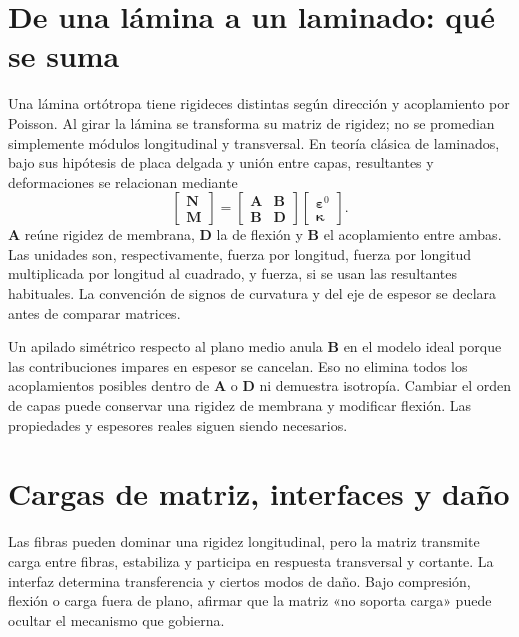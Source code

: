 
\section{De una lámina a un laminado: qué se suma}
Una lámina ortótropa tiene rigideces distintas según dirección y acoplamiento por Poisson. Al girar la lámina se transforma su matriz de rigidez; no se promedian simplemente módulos longitudinal y transversal. En teoría clásica de laminados, bajo sus hipótesis de placa delgada y unión entre capas, resultantes y deformaciones se relacionan mediante
\begin{equation}\begin{bmatrix}\mathbf N\\\mathbf M\end{bmatrix}=\begin{bmatrix}\mathbf A&\mathbf B\\\mathbf B&\mathbf D\end{bmatrix}\begin{bmatrix}\boldsymbol\varepsilon^0\\\boldsymbol\kappa\end{bmatrix}.\end{equation}
$\mathbf A$ reúne rigidez de membrana, $\mathbf D$ la de flexión y $\mathbf B$ el acoplamiento entre ambas. Las unidades son, respectivamente, fuerza por longitud, fuerza por longitud multiplicada por longitud al cuadrado, y fuerza, si se usan las resultantes habituales. La convención de signos de curvatura y del eje de espesor se declara antes de comparar matrices.

Un apilado simétrico respecto al plano medio anula $\mathbf B$ en el modelo ideal porque las contribuciones impares en espesor se cancelan. Eso no elimina todos los acoplamientos posibles dentro de $\mathbf A$ o $\mathbf D$ ni demuestra isotropía. Cambiar el orden de capas puede conservar una rigidez de membrana y modificar flexión. Las propiedades y espesores reales siguen siendo necesarios.
\section{Cargas de matriz, interfaces y daño}
Las fibras pueden dominar una rigidez longitudinal, pero la matriz transmite carga entre fibras, estabiliza y participa en respuesta transversal y cortante. La interfaz determina transferencia y ciertos modos de daño. Bajo compresión, flexión o carga fuera de plano, afirmar que la matriz «no soporta carga» puede ocultar el mecanismo que gobierna.


